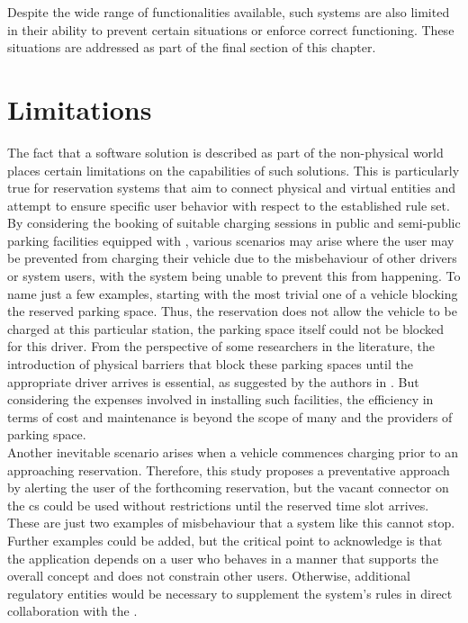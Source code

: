 \noindent Despite the wide range of functionalities available, such systems are also limited in their ability to prevent certain situations or enforce correct functioning. These situations are addressed as part of the final section of this chapter.

\section{Limitations}
\label{ch:Analysis and Validation:sec:Limitations}

The fact that a software solution is described as part of the non-physical world places certain limitations on the capabilities of such solutions. This is particularly true for reservation systems that aim to connect physical and virtual entities and attempt to ensure specific user behavior with respect to the established rule set.
By considering the booking of suitable charging sessions in public and semi-public parking facilities equipped with , various scenarios may arise where the user may be prevented from charging their vehicle due to the misbehaviour of other drivers or system users, with the system being unable to prevent this from happening.
To name just a few examples, starting with the most trivial one of a vehicle blocking the reserved parking space. Thus, the reservation does not allow the vehicle to be charged at this particular station, the parking space itself could not be blocked for this driver.
From the perspective of some researchers in the literature, the introduction of physical barriers that block these parking spaces until the appropriate driver arrives is essential, as suggested by the authors in \cite{basmadjian_reference_2020}.
But considering the expenses involved in installing such facilities, the efficiency in terms of cost and maintenance is beyond the scope of many  and the providers of parking space. \\
Another inevitable scenario arises when a vehicle commences charging prior to an approaching reservation. Therefore, this study proposes a preventative approach by alerting the user of the forthcoming reservation, but the vacant connector on the \acrshort{cs} could be used without restrictions until the reserved time slot arrives.
These are just two examples of misbehaviour that a system like this cannot stop. Further examples could be added, but the critical point to acknowledge is that the application depends on a user who behaves in a manner that supports the overall concept and does not constrain other users.
Otherwise, additional regulatory entities would be necessary to supplement the system's rules in direct collaboration with the .
